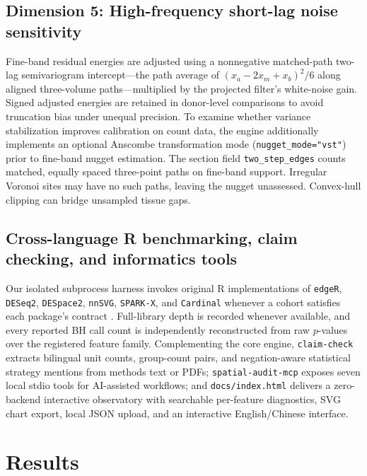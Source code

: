 \documentclass[11pt]{article}
\begin{document}
\subsection{Dimension 5: High-frequency short-lag noise sensitivity}
Fine-band residual energies are adjusted using a nonnegative matched-path two-lag semivariogram intercept---the path average of $(x_a - 2x_m + x_b)^2 / 6$ along aligned three-volume paths---multiplied by the projected filter's white-noise gain. Signed adjusted energies are retained in donor-level comparisons to avoid truncation bias under unequal precision. To examine whether variance stabilization improves calibration on count data, the engine additionally implements an optional Anscombe transformation mode (\texttt{nugget\_mode="vst"}) prior to fine-band nugget estimation. The section field \texttt{two\_step\_edges} counts matched, equally spaced three-point paths on fine-band support. Irregular Voronoi sites may have no such paths, leaving the nugget unassessed. Convex-hull clipping can bridge unsampled tissue gaps.

\subsection{Cross-language R benchmarking, claim checking, and informatics tools}
Our isolated subprocess harness invokes original R implementations of \texttt{edgeR}, \texttt{DESeq2}, \texttt{DESpace2}, \texttt{nnSVG}, \texttt{SPARK-X}, and \texttt{Cardinal} whenever a cohort satisfies each package's contract \cite{edger,deseq2,despace2,nnsvg,sparkx,cardinal}. Full-library depth is recorded whenever available, and every reported BH call count is independently reconstructed from raw $p$-values over the registered feature family. Complementing the core engine, \texttt{claim-check} extracts bilingual unit counts, group-count pairs, and negation-aware statistical strategy mentions from methods text or PDFs; \texttt{spatial-audit-mcp} exposes seven local stdio tools for AI-assisted workflows; and \texttt{docs/index.html} delivers a zero-backend interactive observatory with searchable per-feature diagnostics, SVG chart export, local JSON upload, and an interactive English/Chinese interface.

\section{Results}
\end{document}
